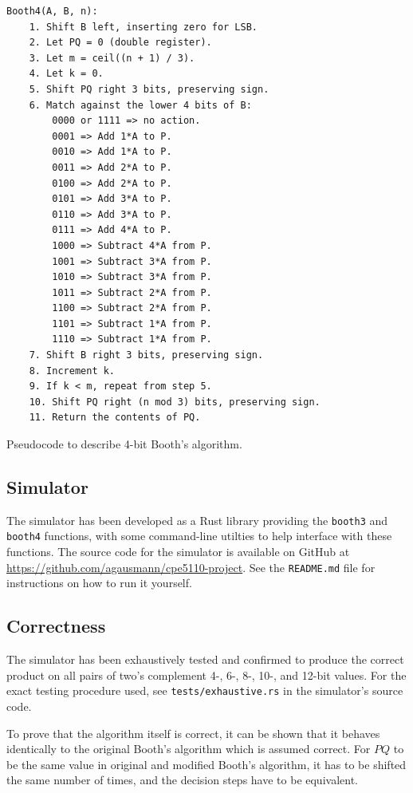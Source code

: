 \documentclass[12pt]{article}
\begin{document}
\begin{algorithm}[H]
	\begin{lstlisting}
Booth4(A, B, n):
    1. Shift B left, inserting zero for LSB.
    2. Let PQ = 0 (double register).
    3. Let m = ceil((n + 1) / 3).
    4. Let k = 0.
    5. Shift PQ right 3 bits, preserving sign.
    6. Match against the lower 4 bits of B:
        0000 or 1111 => no action.
        0001 => Add 1*A to P.
        0010 => Add 1*A to P.
        0011 => Add 2*A to P.
        0100 => Add 2*A to P.
        0101 => Add 3*A to P.
        0110 => Add 3*A to P.
        0111 => Add 4*A to P.
        1000 => Subtract 4*A from P.
        1001 => Subtract 3*A from P.
        1010 => Subtract 3*A from P.
        1011 => Subtract 2*A from P.
        1100 => Subtract 2*A from P.
        1101 => Subtract 1*A from P.
        1110 => Subtract 1*A from P.
    7. Shift B right 3 bits, preserving sign.
    8. Increment k.
    9. If k < m, repeat from step 5.
    10. Shift PQ right (n mod 3) bits, preserving sign.
    11. Return the contents of PQ.
	\end{lstlisting}
    \caption{Pseudocode to describe 4-bit Booth's algorithm.}
    \label{alg:booth4}
\end{algorithm}
\newpage

\subsection{Simulator}

The simulator has been developed as a Rust library providing the
\texttt{booth3} and \texttt{booth4} functions, with some command-line utilties
to help interface with these functions. The source code for the simulator is
available on GitHub at \url{https://github.com/agausmann/cpe5110-project}. See
the \texttt{README.md} file for instructions on how to run it yourself.

\subsection{Correctness}

The simulator has been exhaustively tested and confirmed to produce the correct
product on all pairs of two's complement 4-, 6-, 8-, 10-, and 12-bit values.
For the exact testing procedure used, see \texttt{tests/exhaustive.rs} in the
simulator's source code.

To prove that the algorithm itself is correct, it can be shown that it behaves
identically to the original Booth's algorithm which is assumed correct.  For
$PQ$ to be the same value in original and modified Booth's algorithm, it has to
be shifted the same number of times, and the decision steps have to be
equivalent.
\end{document}
